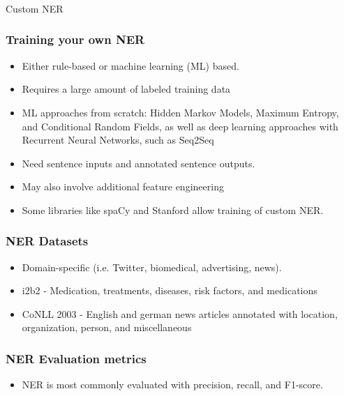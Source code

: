 \begin{frame}[fragile]\frametitle{}

\begin{center}
{\Large Custom NER}
\end{center}
\end{frame}

\begin{frame}[fragile]\frametitle{Training your own NER}
  \begin{itemize}
  \item Either rule-based or machine learning (ML) based.
	\item Requires a large amount of labeled training data
	\item ML approaches from scratch: Hidden Markov Models, Maximum Entropy, and Conditional Random Fields, as well as deep learning approaches with Recurrent Neural Networks, such as Seq2Seq
	\item Need sentence inputs and annotated sentence outputs. 
	\item May also involve additional feature engineering
	\item Some libraries like spaCy and Stanford allow training of custom NER.
  \end{itemize}
\end{frame}


\begin{frame}[fragile]\frametitle{NER Datasets}
  \begin{itemize}
  \item Domain-specific (i.e. Twitter, biomedical, advertising, news).
	\item i2b2 - Medication, treatments, diseases, risk factors, and medications
	\item CoNLL 2003 - English and german news articles annotated with location, organization, person, and miscellaneous
  \end{itemize}
\end{frame}


\begin{frame}[fragile]\frametitle{NER Evaluation metrics}
  \begin{itemize}
  \item NER is most commonly evaluated with precision, recall, and F1-score.
  \end{itemize}
\end{frame}


